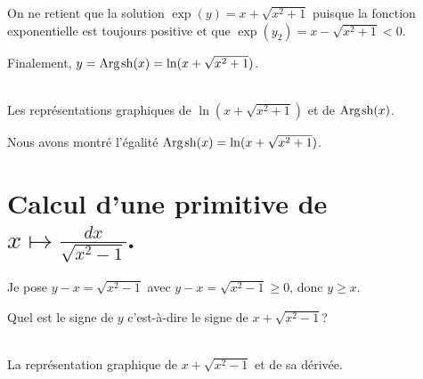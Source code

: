 \documentclass[a4paper,12pt]{report}
\renewcommand{\sinh}{\mathop{\mathrm{sh}}}
\renewcommand{\arg}{\mathop{\mathrm{Arg}}}
\begin{document}
On ne retient que la solution $ \exp(y) = x + \sqrt{x^2+1}$ puisque la fonction exponentielle est toujours positive et que $ \exp(y_2) = x - \sqrt{x^2+1} < 0 $.

Finalement, $y = \arg\mspace{-1mu}\sinh\nolimits(x) = \ln(x + \sqrt{x^2+1})$.


\begin{center}
 \\
Les représentations graphiques de $\ln(x + \sqrt{x^2+1})$ et de $\arg\mspace{-1mu}\sinh\nolimits(x)$.
\end{center}


Nous avons montré l'égalité $\arg\mspace{-1mu}\sinh\nolimits(x) = \ln(x + \sqrt{x^2+1}) $.














\section{Calcul d'une primitive de $ x \longmapsto  \frac{dx}{\sqrt{x^2 - 1} } $. }


Je pose $y-x = \sqrt{x^2 - 1} $ avec $y - x = \sqrt{x^2 - 1} \geqslant 0 $, donc $y \geqslant  x$.

Quel est le signe de $y$ c'est-à-dire le signe de $x + \sqrt{x^2 - 1} $?

\begin{center}
 \\
La représentation graphique de $x + \sqrt{x^2 - 1}$ et de sa dérivée.
\end{center}
\end{document}
